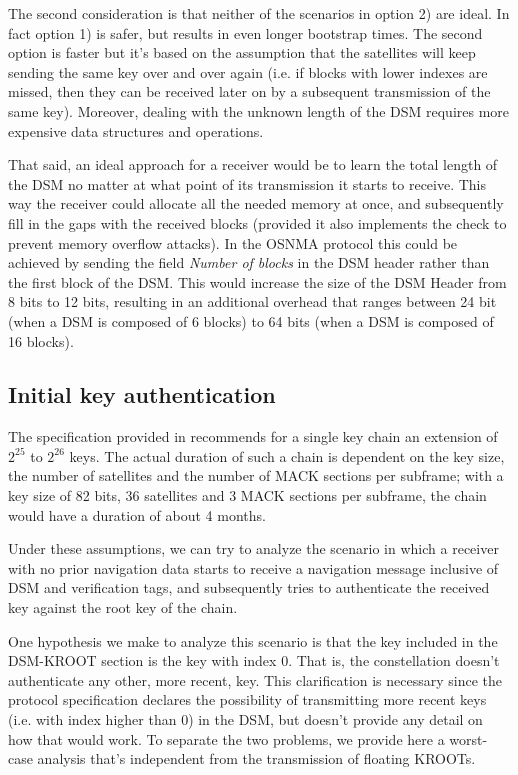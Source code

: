 The second consideration is that neither of the scenarios in option 2) are ideal.
In fact option 1) is safer, but results in even longer bootstrap times. The
second option is faster but it's based on the assumption that the satellites
will keep sending the same key over and over again (i.e. if blocks with lower
indexes are missed, then they can be received later on by a subsequent
transmission of the same key). Moreover, dealing with the unknown length of the
DSM requires more expensive data structures and operations.

That said, an ideal approach for a receiver would be to learn the total length
of the DSM no matter at what point of its transmission it starts to receive.
This way the receiver could allocate all the needed memory at once, and
subsequently fill in the gaps with the received blocks (provided it also
implements the check to prevent memory overflow attacks). In the OSNMA protocol
this could be achieved by sending the field \textit{Number of blocks} in the DSM
header rather than the first block of the DSM. This would increase the size of
the DSM Header from 8 bits to 12 bits, resulting in an additional overhead that
ranges between 24 bit (when a DSM is composed of 6 blocks) to 64 bits (when a
DSM is composed of 16 blocks).

\subsection{Initial key authentication}
The specification provided in \cite{osnma} recommends for a single key chain
an extension of $2^{25}$ to $2^{26}$ keys. The actual duration of such a chain
is dependent on the key size, the number of satellites and the number of MACK
sections per subframe; with a key size of 82 bits, 36 satellites and 3 MACK
sections per subframe, the chain would have a duration of about 4 months.

Under these assumptions, we can try to analyze the scenario in which a receiver
with no prior navigation data starts to receive a navigation message inclusive
of DSM and verification tags, and subsequently tries to authenticate the
received key against the root key of the chain.

One hypothesis we make to analyze this scenario is that the key included in the
DSM-KROOT section is the key with index $0$. That is, the constellation doesn't
authenticate any other, more recent, key. This clarification is necessary since
the protocol specification declares the possibility of transmitting more recent
keys (i.e. with index higher than $0$) in the DSM, but doesn't provide any
detail on how that would work. To separate the two problems, we provide here a
worst-case analysis that's independent from the transmission of floating KROOTs.

